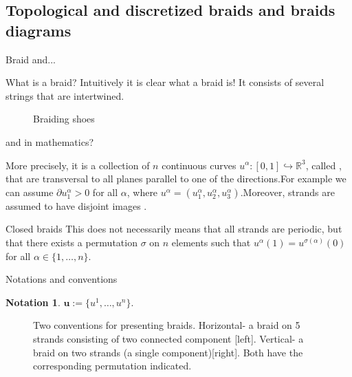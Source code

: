 \documentclass[9pt, english]{beamer}
\theoremstyle{definition}
\newtheorem{notation}[thm]{Notation}
\newcommand{\simbolovettore}[1]{{\boldsymbol{#1}}}
\newcommand{\vu}{\simbolovettore{u}}
\newcommand{\R}{\mathbb{R}}                     %
\begin{document}
\subsection{Topological and discretized braids and braids diagrams}
\begin{frame}{Braid and... }
    \begin{block}{What is a braid?}\pause
        Intuitively it is clear what a braid is! It consists of several strings that are
        intertwined.\pause
        \begin{figure}\label{fig:shoes}
        \caption{Braiding shoes}
        \end{figure}
\end{block}
\end{frame}
\begin{frame}{and in mathematics?}
    \begin{block}{More precisely,}
        it is a collection of $n$ continuous curves
        $u^\alpha:[0,1] \hookrightarrow \R^3$, called
        {\color{blue}{
        strands}\/},\pause
        that are transversal to all planes parallel to one of the
        directions.\pause  For example we can assume $\partial u_1^\alpha>0$
        for all $\alpha$, where $u^\alpha=(u_1^\alpha, u_2^\alpha,
        u_3^\alpha)$.\pause Moreover, strands are assumed to have disjoint
        images {\color{red}{(they do not intersect)}.\/}
    \end{block}\pause
    \begin{block}{Closed braids}
        This does not necessarily means that all strands are
        periodic,\pause
        but that there exists a permutation $\sigma$ on $n$ elements such
        that $u^\alpha(1)=u^{\sigma(\alpha)}(0)$ for all $\alpha \in
        \{1, \dots,n\}$.
    \end{block}
\end{frame}
\begin{frame}{Notations and conventions}
        \begin{notation}
        $\vu:=\{u^1, \dots, u^n\}$.
        \end{notation}\pause
        \begin{figure}\label{fig:permutation}
        \caption{Two conventions for presenting braids.
        Horizontal- a braid on 5 strands consisting of two connected component [left]. Vertical- a braid on two strands
        (a single component)[right]. Both have the corresponding permutation indicated.}
        \end{figure}
\end{frame}
\end{document}

